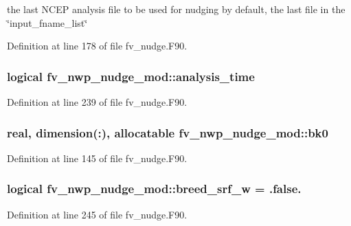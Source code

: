 the last N\-C\-E\-P analysis file to be used for nudging by default, the last file in the \char`\"{}input\-\_\-fname\-\_\-list\char`\"{} 



Definition at line 178 of file fv\-\_\-nudge.\-F90.

\subsubsection[{analysis\-\_\-time}]{\setlength{\rightskip}{0pt plus 5cm}logical fv\-\_\-nwp\-\_\-nudge\-\_\-mod\-::analysis\-\_\-time\hspace{0.3cm}{\ttfamily [private]}}\label{classfv__nwp__nudge__mod_ad4ade09f973cb7f9027724a6f0dfa3e2}


Definition at line 239 of file fv\-\_\-nudge.\-F90.

\subsubsection[{bk0}]{\setlength{\rightskip}{0pt plus 5cm}real, dimension(\-:), allocatable fv\-\_\-nwp\-\_\-nudge\-\_\-mod\-::bk0\hspace{0.3cm}{\ttfamily [private]}}\label{classfv__nwp__nudge__mod_a0af47ffec9b92d67039b57e73d9a22ed}


Definition at line 145 of file fv\-\_\-nudge.\-F90.

\subsubsection[{breed\-\_\-srf\-\_\-w}]{\setlength{\rightskip}{0pt plus 5cm}logical fv\-\_\-nwp\-\_\-nudge\-\_\-mod\-::breed\-\_\-srf\-\_\-w = .false.\hspace{0.3cm}{\ttfamily [private]}}\label{classfv__nwp__nudge__mod_abe2b674214dcb600da0917bed138a693}


Definition at line 245 of file fv\-\_\-nudge.\-F90.

